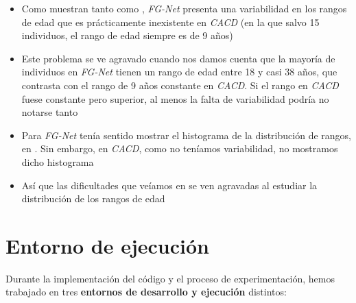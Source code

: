\begin{itemize}
    \item Como muestran tanto  como , \textit{FG-Net} presenta una variabilidad en los rangos de edad que es prácticamente inexistente en \textit{CACD} (en la que salvo 15 individuos, el rango de edad siempre es de 9 años)
    \item Este problema se ve agravado cuando nos damos cuenta que la mayoría de individuos en \textit{FG-Net} tienen un rango de edad entre 18 y casi 38 años, que contrasta con el rango de 9 años constante en \textit{CACD}. Si el rango en \textit{CACD} fuese constante pero superior, al menos la falta de variabilidad podría no notarse tanto
    \item Para \textit{FG-Net} tenía sentido mostrar el histograma de la distribución de rangos, en . Sin embargo, en \textit{CACD}, como no teníamos variabilidad, no mostramos dicho histograma
    \item Así que las dificultades que veíamos en  se ven agravadas al estudiar la distribución de los rangos de edad
\end{itemize}

\section{Entorno de ejecución} \label{isec:entorno_ejecucion}

Durante la implementación del código y el proceso de experimentación, hemos trabajado en tres \textbf{entornos de desarrollo y ejecución} distintos:

